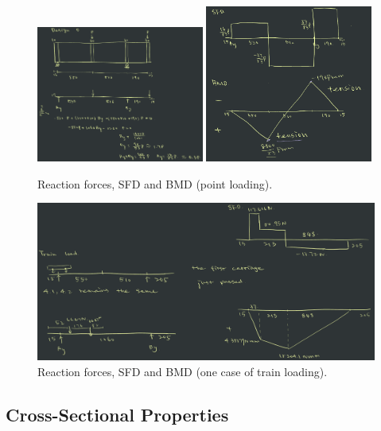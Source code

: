 \documentclass{article}
\begin{document}
\begin{figure}[H]
    \centering
    \includegraphics[width=0.49\textwidth]{forces.png}
    \includegraphics[width=0.49\textwidth]{sfd_bmd.png}
    \caption{Reaction forces, SFD and BMD (point loading).}
\end{figure}

\begin{figure}[H]
    \centering
    \includegraphics[width=\textwidth]{train.png}
    \caption{Reaction forces, SFD and BMD (one case of train loading).}
\end{figure}

\subsection{Cross-Sectional Properties}
\end{document}
